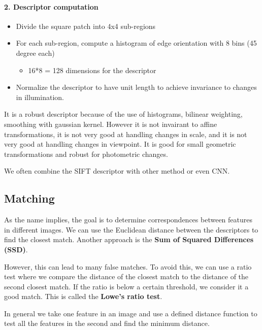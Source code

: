 \documentclass[
  a4paper,
  ,captions=tableheading
]{scrartcl}
\providecommand{\tightlist}{%
  \setlength{\itemsep}{0pt}\setlength{\parskip}{0pt}}
\begin{document}
\paragraph{2. Descriptor computation}\label{descriptor-computation}

\begin{itemize}
\tightlist
\item
  Divide the square patch into 4x4 sub-regions
\item
  For each sub-region, compute a histogram of edge orientation with 8
  bins (45 degree each)

  \begin{itemize}
  \tightlist
  \item
    16*8 = 128 dimensions for the descriptor
  \end{itemize}
\item
  Normalize the descriptor to have unit length to achieve invariance to
  changes in illumination.
\end{itemize}

It is a robust descriptor because of the use of histograms, bilinear
weighting, smoothing with gaussian kernel. However it is not invairant
to affine transformations, it is not very good at handling changes in
scale, and it is not very good at handling changes in viewpoint. It is
good for small geometric transformations and robust for photometric
changes.

We often combine the SIFT descriptor with other method or even CNN.

\subsection{Matching}\label{matching}

As the name implies, the goal is to determine correspondences between
features in different images. We can use the Euclidean distance between
the descriptors to find the closest match. Another approach is the
\textbf{Sum of Squared Differences (SSD)}.

However, this can lead to many false matches. To avoid this, we can use
a ratio test where we compare the distance of the closest match to the
distance of the second closest match. If the ratio is below a certain
threshold, we consider it a good match. This is called the
\textbf{Lowe's ratio test}.

In general we take one feature in an image and use a defined distance
function to test all the features in the second and find the minimum
distance.
\end{document}
